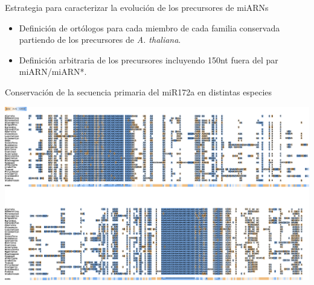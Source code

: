 \documentclass{beamer}
\begin{document}
\begin{frame}{Estrategia para caracterizar la evolución de los precursores de miARNs}
    \begin{itemize}
		\item Definición de ortólogos para cada miembro de cada familia conservada partiendo de los precursores de \textit{A. thaliana}.
        \item Definición arbitraria de los precursores incluyendo 150nt fuera del par miARN/miARN*.
    \end{itemize}
\end{frame}

    
    


\begin{frame}{Conservación de la secuencia primaria del miR172a en distintas especies}
	\begin{center}
		\includegraphics[width=1\textwidth]{img/miR172a_tcoffee_01.png}
	\end{center}
\end{frame}
\end{document}
